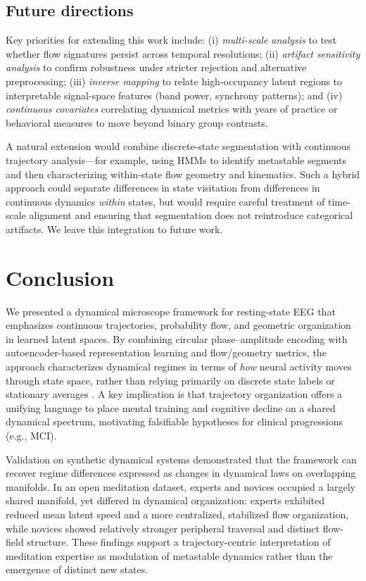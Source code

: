 \documentclass[5p,twocolumn,authoryear]{elsarticle}
\begin{document}
\subsection{Future directions}
Key priorities for extending this work include: (i) \emph{multi-scale analysis} to test whether flow signatures persist across temporal resolutions; (ii) \emph{artifact sensitivity analysis} to confirm robustness under stricter rejection and alternative preprocessing; (iii) \emph{inverse mapping} to relate high-occupancy latent regions to interpretable signal-space features (band power, synchrony patterns); and (iv) \emph{continuous covariates} correlating dynamical metrics with years of practice or behavioral measures to move beyond binary group contrasts.

A natural extension would combine discrete-state segmentation with continuous trajectory analysis---for example, using HMMs to identify metastable segments and then characterizing within-state flow geometry and kinematics. Such a hybrid approach could separate differences in state visitation from differences in continuous dynamics \emph{within} states, but would require careful treatment of time-scale alignment and ensuring that segmentation does not reintroduce categorical artifacts. We leave this integration to future work.

\section{Conclusion}
\label{sec:conclusion}
We presented a dynamical microscope framework for resting-state EEG that emphasizes continuous trajectories, probability flow, and geometric organization in learned latent spaces. By combining circular phase--amplitude encoding with autoencoder-based representation learning and flow/geometry metrics, the approach characterizes dynamical regimes in terms of \emph{how} neural activity moves through state space, rather than relying primarily on discrete state labels or stationary averages \citep{CahnPolich2006}. A key implication is that trajectory organization offers a unifying language to place mental training and cognitive decline on a shared dynamical spectrum, motivating falsifiable hypotheses for clinical progressions (e.g., MCI). 

Validation on synthetic dynamical systems demonstrated that the framework can recover regime differences expressed as changes in dynamical laws on overlapping manifolds. In an open meditation dataset, experts and novices occupied a largely shared manifold, yet differed in dynamical organization: experts exhibited reduced mean latent speed and a more centralized, stabilized flow organization, while novices showed relatively stronger peripheral traversal and distinct flow-field structure. These findings support a trajectory-centric interpretation of meditation expertise as modulation of metastable dynamics rather than the emergence of distinct new states.
\end{document}
